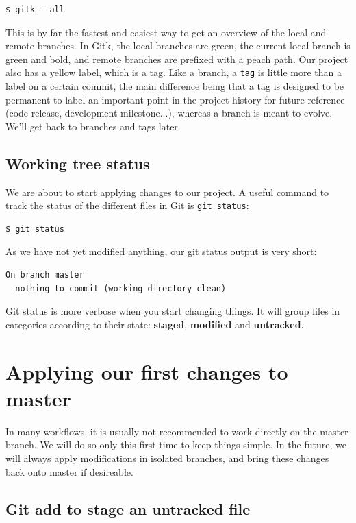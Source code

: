\documentclass{../common/tufte-latex/tufte-handout}
\begin{document}
\begin{lstlisting}[style=BashInputStyle]
  $ gitk --all
\end{lstlisting}

This is by far the fastest and easiest way to get an overview of the local and remote branches.
In Gitk, the local branches are green, the current local branch is green and bold, and remote branches are prefixed with a peach path.
Our project also has a yellow label, which is a tag.
Like a branch, a \texttt{tag} is little more than a label on a certain commit, the main difference being that a tag is designed to be permanent to label an important point in the project history for future reference (code release, development milestone...), whereas a branch is meant to evolve.
We'll get back to branches and tags later.

\subsection{Working tree status}

We are about to start applying changes to our project.
A useful command to track the status of the different files in Git is \texttt{git status}:

\begin{lstlisting}[style=BashInputStyle]
  $ git status
\end{lstlisting}

As we have not yet modified anything, our git status output is very short:

\begin{lstlisting}[style=BashInputStyle]
  On branch master
  nothing to commit (working directory clean)
\end{lstlisting}

Git status is more verbose when you start changing things.
It will group files in categories according to their state: \textbf{staged}, \textbf{modified} and \textbf{untracked}.

\section{Applying our first changes to master}
In many workflows, it is usually not recommended to work directly on the master branch.
We will do so only this first time to keep things simple.
In the future, we will always apply modifications in isolated branches, and bring these changes back onto master if desireable.

\subsection{Git add to stage an untracked file}
\end{document}
